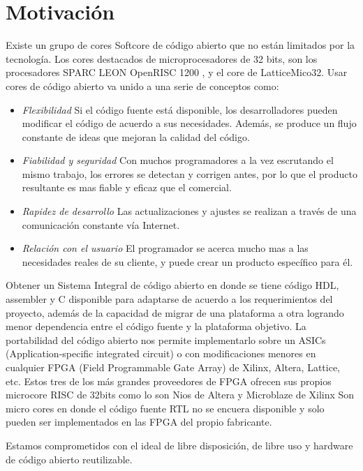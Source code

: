 \section{Motivación} 

Existe un grupo de cores Softcore de código abierto que no están limitados por la tecnología. Los cores destacados de microprocesadores de 32 bits,
son los procesadores SPARC LEON OpenRISC 1200 , y el core de LatticeMico32. Usar cores de código abierto va unido a una serie de conceptos como:
\begin {itemize}
\item
\textit{Flexibilidad}  Si el código fuente está disponible, los desarrolladores pueden modificar el código de acuerdo a sus necesidades. Además, se
produce un flujo constante de ideas que mejoran la calidad del código.
\item 
\textit{Fiabilidad y seguridad}  Con muchos programadores a la vez escrutando el mismo trabajo, los errores se detectan y corrigen antes, por lo que
el producto resultante es mas fiable y eficaz que el comercial.
\item 
\textit{Rapidez de desarrollo}  Las actualizaciones y ajustes se realizan a través de una comunicación constante vía Internet.
\item 
\textit{Relación con el usuario} El programador se acerca mucho mas a las necesidades reales de su cliente, y puede crear un producto específico para
él.
 \end {itemize}
 
Obtener un Sistema Integral de código abierto en donde se tiene código HDL, assembler y C disponible para adaptarse de acuerdo a los requerimientos
del proyecto, además de la capacidad de migrar de una plataforma a otra logrando menor dependencia entre el código fuente y la plataforma
objetivo. La portabilidad del código abierto nos permite implementarlo sobre un ASICs (Application-specific integrated circuit) o con modificaciones
menores en cualquier FPGA (Field Programmable Gate Array) de Xilinx, Altera, Lattice, etc. Estos tres de los más grandes proveedores de FPGA  %
ofrecen sus propios microcore RISC de 32bits como lo son Nios de  Altera y Microblaze de Xilinx  Son micro cores en donde el código fuente RTL no se
encuera disponible y solo pueden ser implementados en las FPGA del propio fabricante.



Estamos comprometidos con el ideal de libre disposición, de libre uso y hardware de código abierto reutilizable.


